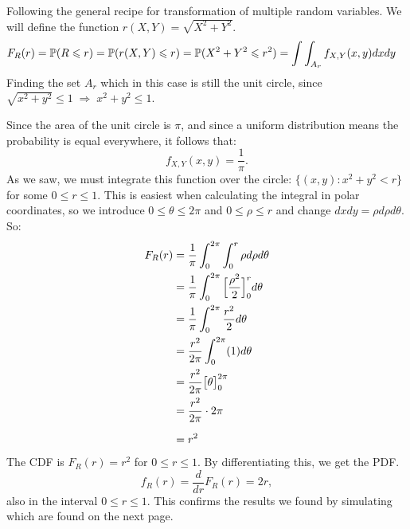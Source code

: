 \medskip\noindent
Following the general recipe for transformation of multiple random variables. We will define
the function $r(X,Y) = \sqrt{X^2 + Y^2}$. %
\begin{align*}
    F_R(r) &= \P(R\leq r) = \P(r(X,Y)\leq r)
    = \P(X^2 + Y^2\leq r^2) = \int\int_{A_r}f_{X,Y}(x,y)dxdy
\end{align*}
Finding the set $A_r$ which in this case is still the unit circle,
since $\sqrt{x^2 + y^2} \leq 1 \;\Longrightarrow\; x^2 + y^2 \leq 1$.

Since the area of the unit circle is $\pi$, and since a uniform distribution means
the probability is equal everywhere, it follows that:
$$
f_{X,Y}(x,y) = \frac{1}{\pi}.
$$
As we saw, we must integrate this function over the circle: $\{(x,y) : x^2 + y^2 < r\}$
for some $0\leq r \leq 1$.
This is easiest when calculating the integral in polar coordinates, so we introduce
$0\leq \theta\leq 2\pi$ and $0\leq \rho\leq r$ and change $dxdy = \rho d\rho d\theta$.
So:
\begin{align*}
   F_R(r) &= \frac{1}{\pi}\int_{0}^{2\pi}\int_{0}^{r} \rho d\rho d\theta \\
   &= \frac{1}{\pi}\int_{0}^{2\pi}\Big[\frac{\rho^2}{2}\Big]_0^r d\theta \\
   &= \frac{1}{\pi}\int_{0}^{2\pi}\frac{r^2}{2} d\theta \\
   &= \frac{r^2}{2\pi}\int_{0}^{2\pi}(1) d\theta \\
   &= \frac{r^2}{2\pi}\big[\theta\big]_{0}^{2\pi} \\
   &= \frac{r^2}{2\pi}\cdot 2\pi \\
   &= \rule{0pt}{15pt}r^2 
\end{align*}
The CDF is $F_R(r) = r^2$ for $0\leq r\leq 1$. By differentiating this, we get the PDF.
$$
f_R(r) = \frac{d}{dr}F_R(r) = 2r,
$$
also in the interval $0\leq r\leq 1$. This confirms the results we found by simulating
which are found on the next page.
